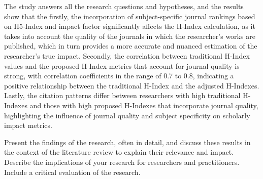 The study answers all the research questions and hypotheses, and the results
show that the firstly, the incorporation of subject-specific journal rankings
based on H5-Index and impact factor significantly affects the H-Index
calculation, as it takes into account the quality of the journals in which the
researcher’s works are published, which in turn provides a more accurate and
nuanced estimation of the researcher’s true impact. Secondly, the correlation
between traditional H-Index values and the proposed H-Index metrics that
account for journal quality is strong, with correlation coefficients in the
range of 0.7 to 0.8, indicating a positive relationship between the traditional
H-Index and the adjusted H-Indexes. Lastly, the citation patterns differ
between researchers with high traditional H-Indexes and those with high
proposed H-Indexes that incorporate journal quality, highlighting the influence
of journal quality and subject specificity on scholarly impact metrics.

Present the findings of the research, often in detail, and discuss these
results in the context of the literature review to explain their relevance and
impact. Describe the implications of your research for researchers and
practitioners. Include a critical evaluation of the research.

